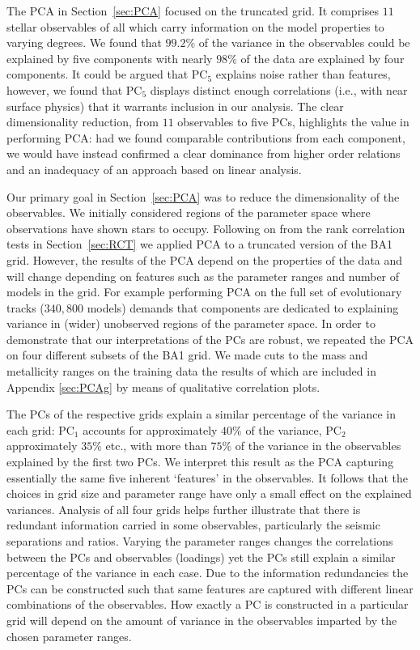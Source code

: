 The PCA in Section~\ref{sec:PCA} focused on the truncated grid. It comprises $11$ stellar observables of all which carry information on the model properties to varying degrees. 
 We found that $99.2\%$ of the variance in the observables could be explained by five components with
nearly $98\%$ of the data are explained by four components. It could be argued that PC$_5$ explains noise rather than features, however, we found that PC$_5$ displays distinct enough correlations (i.e., with near surface physics) that it warrants inclusion in our analysis. 
The clear dimensionality reduction, from $11$ observables to five PCs,  highlights the value in performing PCA: had we found comparable contributions from each component, we would have instead confirmed a clear dominance from higher order relations and an inadequacy of an approach based on linear analysis. 


Our primary goal in Section~\ref{sec:PCA} was to reduce the dimensionality of the observables.
We initially considered regions of the parameter space where observations have shown stars to occupy. 
Following on from the rank correlation tests in Section~\ref{sec:RCT} we applied PCA to a truncated version of the BA1 grid.  
However, the results of the PCA depend on the properties of the data and will change depending on features such as the parameter ranges and number of models in the grid. 
For example performing PCA on the full set of evolutionary tracks ($340,800$ models) demands that components are dedicated to explaining variance in (wider) unobserved regions of the parameter space. 
In order to demonstrate that our interpretations of the PCs are robust, we repeated the PCA on four different subsets of the BA1 grid. 
 We made cuts to the mass and metallicity ranges on the training data the results of which are included in Appendix \ref{sec:PCAg} by means of qualitative correlation plots. 
 
The PCs of the respective grids explain a similar percentage of the variance in each grid: PC$_1$ accounts for approximately  $40\%$ of the variance,  PC$_2$  approximately  $35\%$  etc.,  with more than  $75\%$ of the variance in the observables explained by the first two PCs. 
We interpret this result as the PCA capturing essentially the same five inherent `features' in the observables. 
It follows that the choices in grid size and parameter range have only a small effect on the explained variances.
Analysis of all four grids helps further illustrate that there is redundant information carried in some observables, particularly the seismic separations and ratios. 
Varying the parameter ranges changes the correlations between the PCs and observables (loadings) yet the PCs still explain a similar percentage of the variance in each case.  
Due to the information redundancies the PCs can be constructed such that same features are captured with different linear combinations of the observables.
How exactly a PC is constructed in a particular grid will depend on the amount of variance in the observables imparted by the chosen parameter ranges. 


